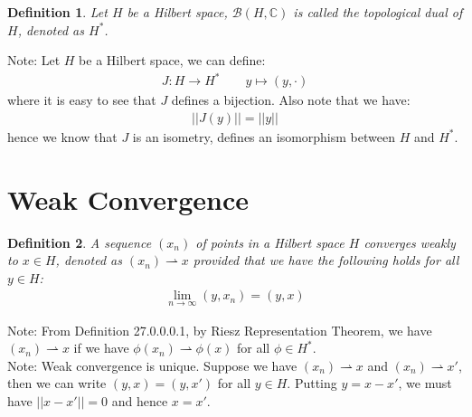 \documentclass[11pt]{book}
\theoremstyle{break}
\theoremstyle{break}
\newtheorem{defn}{Definition}[corL]
\newcommand{\C}{\mathbb{C}}
\newcommand{\note}{\color{red}Note: \color{black}}
\begin{document}
\begin{defn}
Let $H$ be a Hilbert space, $\mathcal{B}(H,\C)$ is called the topological dual of $H$, denoted as $H^*$. 
\end{defn}
\note Let $H$ be a Hilbert space, we can define:
\begin{align*}
J: H\to H^* \qquad y\mapsto (y,\cdot)
\end{align*}
where it is easy to see that $J$ defines a bijection. Also note that we have:
\begin{align*}
||J(y)|| = ||y||
\end{align*}
hence we know that $J$ is an isometry, defines an isomorphism between $H$ and $H^*$. 

\newpage
\section[Weak Convergence]{\color{red}Weak Convergence\color{black}}
\begin{defn}
A sequence $(x_n)$ of points in a Hilbert space $H$ converges weakly to $x \in H$, denoted as $(x_n) \rightharpoonup x$ provided that we have the following holds for all $y \in H$:
\begin{align*}
\lim_{n\to \infty}(y,x_n) = (y,x)
\end{align*}
\end{defn}
\note From Definition 27.0.0.0.1, by Riesz Representation Theorem, we have $(x_n) \rightharpoonup x$ if we have $\phi(x_n) \rightharpoonup \phi(x)$ for all $\phi \in H^*$.\\


\note Weak convergence is unique. Suppose we have $(x_n) \rightharpoonup x$ and $(x_n) \rightharpoonup x'$, then we can write $(y,x) = (y,x')$ for all $y \in H$. Putting $y = x-x'$, we must have $||x-x'|| = 0$ and hence $x = x'$.\\
\end{document}
